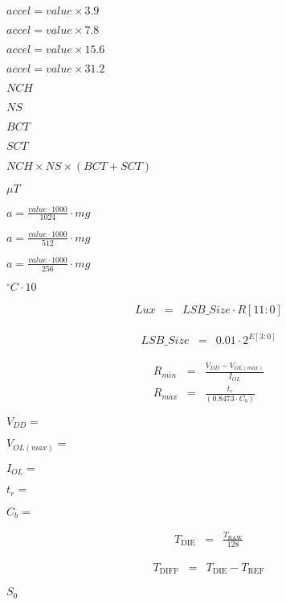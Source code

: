 \documentclass{article}
\begin{document}
$ accel = {value \times 3.9} $
\pagebreak

$ accel = {value \times 7.8} $
\pagebreak

$ accel = {value \times 15.6} $
\pagebreak

$ accel = {value \times 31.2} $
\pagebreak

$NCH$
\pagebreak

$NS$
\pagebreak

$BCT$
\pagebreak

$SCT$
\pagebreak

$ NCH \times NS \times (BCT + SCT) $
\pagebreak

$\mu T$
\pagebreak

$ a = \frac{value \cdot 1000}{1024} \cdot mg $
\pagebreak

$ a = \frac{value \cdot 1000}{512} \cdot mg $
\pagebreak

$ a = \frac{value \cdot 1000}{256} \cdot mg $
\pagebreak

$^\circ C \cdot 10$
\pagebreak

\begin{eqnarray*} Lux &=& LSB\_Size \cdot R[11:0] \end{eqnarray*}
\pagebreak

\begin{eqnarray*} LSB\_Size &=& 0.01 \cdot 2^{E[3:0]} \end{eqnarray*}
\pagebreak

\begin{eqnarray*} R_{min} &=& \frac{V_{DD} - V_{OL(max)}} {I_{OL}}\\ R_{max} &=& \frac{t_r} {(0.8473 \cdot C_b)} \end{eqnarray*}
\pagebreak

$ V_{DD} =$
\pagebreak

$ V_{OL(max)} =$
\pagebreak

$ I_{OL} =$
\pagebreak

$ t_r =$
\pagebreak

$ C_b =$
\pagebreak

\begin{eqnarray*} T_{\mathrm{DIE}} &=& \frac{T_{\mathrm{RAW}}}{128} \end{eqnarray*}
\pagebreak

\begin{eqnarray*} T_{\mathrm{DIFF}} &=& T_{\mathrm{DIE}} - T_{\mathrm{REF}} \end{eqnarray*}
\pagebreak

$S_{\mathrm{0}}$
\pagebreak
\end{document}
